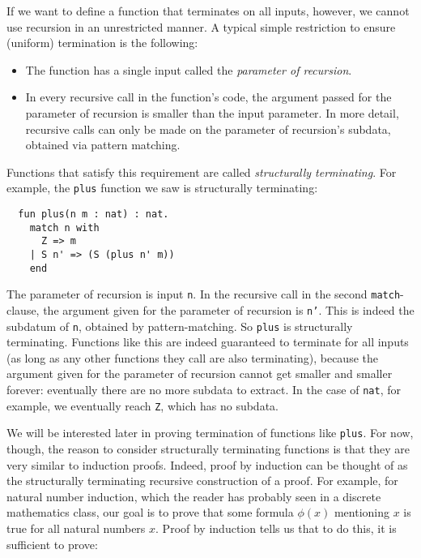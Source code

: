 \documentclass{book}[12pt]
\begin{document}
If we want to define a function that terminates on all inputs,
however, we cannot use recursion in an unrestricted manner.  A typical
simple restriction to ensure (uniform) termination is the following:

\begin{itemize}
\item The function has a single input called the \emph{parameter of
recursion}.
\item In every recursive call in the function's code, the argument
passed for the parameter of recursion is smaller than the input
parameter.  In more detail, recursive calls can only be made on the
parameter of recursion's subdata, obtained via pattern matching.
\end{itemize}

\noindent Functions that satisfy this requirement are called
\emph{structurally terminating}.  For example, the \texttt{plus}
function we saw is structurally terminating:

\begin{verbatim}
  fun plus(n m : nat) : nat.
    match n with
      Z => m
    | S n' => (S (plus n' m))
    end
\end{verbatim}

\noindent The parameter of recursion is input \texttt{n}.  In the
recursive call in the second \texttt{match}-clause, the argument given
for the parameter of recursion is \texttt{n'}. This is indeed the
subdatum of \texttt{n}, obtained by pattern-matching.  So
\texttt{plus} is structurally terminating.  Functions like this are
indeed guaranteed to terminate for all inputs (as long as any other
functions they call are also terminating), because the argument given
for the parameter of recursion cannot get smaller and smaller forever:
eventually there are no more subdata to extract.  In the case of
\texttt{nat}, for example, we eventually reach \texttt{Z}, which has
no subdata.

We will be interested later in proving termination of functions like
\texttt{plus}.  For now, though, the reason to consider structurally
terminating functions is that they are very similar to induction
proofs.  Indeed, proof by induction can be thought of as the
structurally terminating recursive construction of a proof.  For
example, for natural number induction, which the reader has probably
seen in a discrete mathematics class, our goal is to prove that some
formula $\phi(x)$ mentioning $x$ is true for all natural numbers $x$.
Proof by induction tells us that to do this, it is sufficient to
prove:
\end{document}

